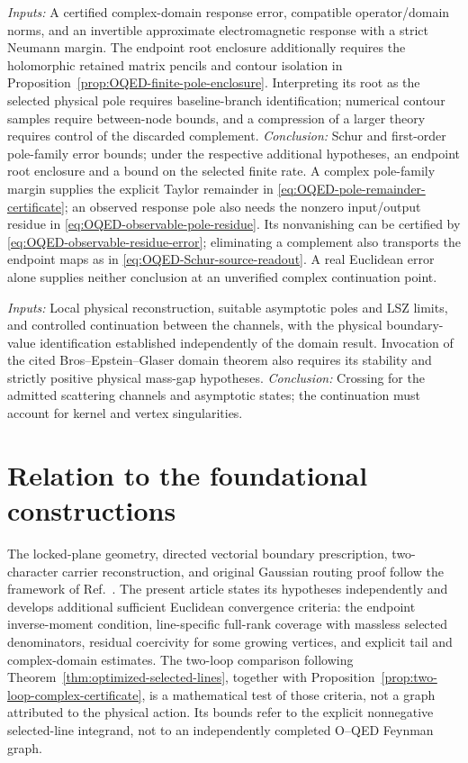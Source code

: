 \documentclass[final,5p,times,twocolumn,numbers,nopreprintline]{elsarticle}
\numberwithin{equation}{section}
\theoremstyle{definition}
\theoremstyle{remark}
\begin{document}
\begin{description}[style=nextline]
\item[Response and pole errors.] \textit{Inputs:} A certified complex-domain
response error, compatible operator/domain norms, and an invertible
approximate electromagnetic response with a strict Neumann margin.
The endpoint root enclosure additionally requires the holomorphic
retained matrix pencils and contour isolation in
Proposition~\ref{prop:OQED-finite-pole-enclosure}. Interpreting its root
as the selected physical pole requires baseline-branch identification;
numerical contour samples require between-node bounds, and a compression
of a larger theory requires control of the discarded complement.
\textit{Conclusion:} Schur and first-order pole-family error bounds;
under the respective additional hypotheses, an endpoint root enclosure
and a bound on the selected finite rate. A complex pole-family margin
supplies the explicit Taylor remainder in
\eqref{eq:OQED-pole-remainder-certificate}; an observed response pole
also needs the nonzero input/output residue in
\eqref{eq:OQED-observable-pole-residue}. Its nonvanishing can be
certified by \eqref{eq:OQED-observable-residue-error}; eliminating a
complement also transports the endpoint maps as in
\eqref{eq:OQED-Schur-source-readout}. A real Euclidean error alone
supplies neither conclusion at an unverified complex continuation point.

\item[Physical crossing.] \textit{Inputs:} Local physical reconstruction,
suitable asymptotic poles and LSZ limits, and controlled continuation
between the channels, with the physical boundary-value identification
established independently of the domain result. Invocation of the cited
Bros--Epstein--Glaser domain theorem also requires its stability and
strictly positive physical mass-gap hypotheses.
\textit{Conclusion:} Crossing for the admitted scattering channels
and asymptotic states; the continuation must account for kernel
and vertex singularities.
\end{description}

\section{Relation to the foundational constructions}
\label{sec:monograph-differences}

The locked-plane geometry, directed vectorial boundary prescription,
two-character carrier reconstruction, and original Gaussian routing
proof follow the framework of Ref.~\cite{ChiapponeMonograph}.
The present article states its hypotheses independently and develops
additional sufficient Euclidean convergence criteria: the endpoint
inverse-moment condition, line-specific full-rank coverage with
massless selected denominators, residual coercivity for some
growing vertices, and explicit tail and complex-domain estimates.
The two-loop comparison following
Theorem~\ref{thm:optimized-selected-lines}, together with
Proposition~\ref{prop:two-loop-complex-certificate}, is a
mathematical test of those criteria, not a graph attributed to the
physical action. Its bounds refer to the explicit nonnegative
selected-line integrand, not to an independently completed
O--QED Feynman graph.
\end{document}
